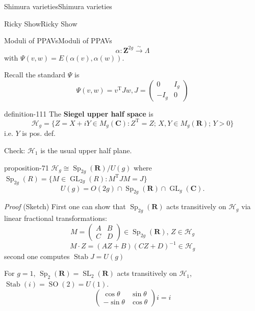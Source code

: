 \documentclass[10pt,]{book}
\makeatletter
\newcommand{\terminology}[1]{\textbf{#1}}
\renewcommand*{\proofname}{Proof}
\renewenvironment{proof}[1][\proofname]{\par
  \pushQED{\qed}%
  \normalfont \topsep6\p@\@plus6\p@\relax
  \trivlist
  \item\relax
    {\itshape
    #1\@addpunct{.}}\hspace\labelsep\ignorespaces
}{%
  \popQED\endtrivlist\@endpefalse
}
\numberwithin{equation}{section}
\newcommand{\inv}{^{-1}}
\newcommand{\ZZ}{\mathbf{Z}}
\newcommand{\RR}{\mathbf{R}}
\newcommand{\CC}{\mathbf{C}}
\newcommand{\transpose}{\mathrm{T}}
\DeclareMathOperator{\Stab}{Stab}
\DeclareMathOperator{\SL}{SL}
\DeclareMathOperator{\GL}{GL}
\DeclareMathOperator{\specialorthogonal}{SO}
\DeclareMathOperator{\Sp}{Sp}
\newcommand{\gt}{>}
\newcommand{\amp}{&}
\makeatother
\begin{document}
\begin{chapterptx}{Shimura varieties}{}{Shimura varieties}{}{}
\begin{sectionptx}{Ricky Show}{}{Ricky Show}{}{}
\begin{subsectionptx}{Moduli of PPAVs}{}{Moduli of PPAVs}{}{}
\begin{equation*}
\alpha \colon \ZZ^{2g} \xrightarrow\sim \Lambda
\end{equation*}
with \(\Psi(v,w) = E(\alpha(v), \alpha(w))\).%
\par
\hypertarget{p-1127}{}%
Recall the standard \(\Psi\) is%
\begin{equation*}
\Psi (v,w) = v^\transpose J w, J = \begin{pmatrix} 0 \amp I_g \\ -I_g \amp 0\end{pmatrix}
\end{equation*}
%
\begin{definition}{}{definition-111}%
\hypertarget{p-1128}{}%
The \terminology{Siegel upper half space} is%
\begin{equation*}
\mathscr H_g = \{ Z = X+iY \in M_g(\CC) : Z^\transpose  = Z ; \, X,Y \in M_g(\RR); \, Y \gt 0\}
\end{equation*}
i.e. \(Y\) is pos. def.%
\end{definition}
\hypertarget{p-1129}{}%
Check: \(\mathscr H_1\) is the usual upper half plane.%
\begin{proposition}{}{}{proposition-71}%
\hypertarget{p-1130}{}%
\(\mathscr H_g \cong \Sp_{2g}(\RR)/U(g)\) where \(\Sp_{2g} (R) = \{ M \in \GL_{2g}(R) : M^\transpose J M = J\}\)%
\begin{equation*}
U(g) = O(2g) \cap \Sp_{2g}(\RR) \cap \GL_{g}(\CC)\text{.}
\end{equation*}
%
\end{proposition}
\begin{proof}\hypertarget{proof-115}{}
\hypertarget{p-1131}{}%
(Sketch) First one can show that \(\Sp_{2g}(\RR)\) acts transitively on \(\mathscr H_g\) via linear fractional transformations:%
\begin{equation*}
M = \begin{pmatrix} A\amp B\\ C\amp D\end{pmatrix} \in \Sp_{2g}(\RR),\, Z\in \mathscr H_g
\end{equation*}
%
\begin{equation*}
M\cdot Z = (AZ+B)(CZ+D)\inv \in \mathscr H_g
\end{equation*}
second one computes \(\Stab J = U(g)\)%
\par
\hypertarget{p-1132}{}%
For \(g= 1\), \(\Sp_2(\RR) = \SL_2(\RR)\) acts transitively on \(\mathscr H_1\), \(\Stab(i) = \specialorthogonal (2) = U(1)\).%
\begin{equation*}
\begin{pmatrix} \cos \theta\amp \sin \theta \\ - \sin \theta \amp \cos \theta \end{pmatrix} i = i

\end{equation*}
\end{proof}
\end{subsectionptx}
\end{sectionptx}
\end{chapterptx}
\end{document}
